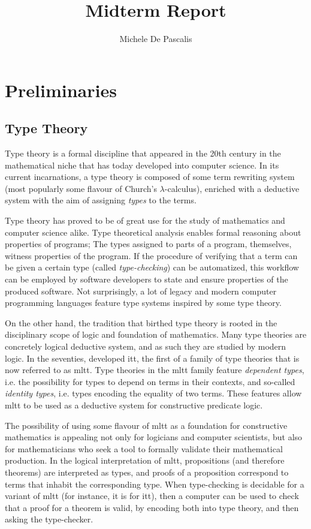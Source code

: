 \documentclass[a4paper]{article}
\author{Michele De Pascalis}
\title{Midterm Report}
\begin{document}
\maketitle

\section{Preliminaries}

\subsection{Type Theory}

Type theory is a formal discipline that appeared in the 20th century in the mathematical niche that has today developed into computer science. In its current incarnations, a type theory is composed of some term rewriting system (most popularly some flavour of Church's \(\lambda\)-calculus), enriched with a deductive system with the aim of assigning \textit{types} to the terms.

Type theory has proved to be of great use for the study of mathematics and computer science alike. Type theoretical analysis enables formal reasoning about properties of programs; The types assigned to parts of a program, themselves, witness properties of the program. If the procedure of verifying that a term can be given a certain type (called \textit{type-checking}) can be automatized, this workflow can be employed by software developers to state and ensure properties of the produced software. Not surprisingly, a lot of legacy and modern computer programming languages feature type systems inspired by some type theory.

On the other hand, the tradition that birthed type theory is rooted in the disciplinary scope of logic and foundation of mathematics. Many type theories are concretely logical deductive system, and as such they are studied by modern logic. In the seventies, \textcite{MartinLoef1998} developed \gls{itt}, the first of a family of type theories that is now referred to as \gls{mltt}. Type theories in the \gls{mltt} family feature \textit{dependent types}, i.e. the possibility for types to depend on terms in their contexts, and so-called \textit{identity types}, i.e. types encoding the equality of two terms. These features allow \gls{mltt} to be used as a deductive system for constructive predicate logic.

The possibility of using some flavour of \gls{mltt} as a foundation for constructive mathematics is appealing not only for logicians and computer scientists, but also for mathematicians who seek a tool to formally validate their mathematical production. In the logical interpretation of \gls{mltt}, propositions (and therefore theorems) are interpreted as types, and proofs of a proposition correspond to terms that inhabit the corresponding type. When type-checking is decidable for a variant of \gls{mltt} (for instance, it is for \gls{itt}), then a computer can be used to check that a proof for a theorem is valid, by encoding both into type theory, and then asking the type-checker.
\end{document}

